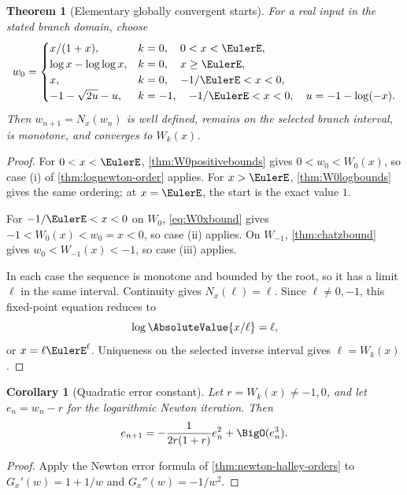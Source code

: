 \documentclass[11pt]{article}
\newtheorem{theorem}{Theorem}[section]
\newtheorem{corollary}[corollary]{Corollary}
\theoremstyle{remark}
\begin{document}
\begin{theorem}[Elementary globally convergent starts]\label{thm:globalstarts}
For a real input in the stated branch domain, choose
\begin{equation}\label{eq:globalstarts}
 w_0=
 \begin{cases}
  x/(1+x),&k=0,\quad 0<x<\EulerE,\\
  \log x-\log\log x,&k=0,\quad x\geq\EulerE,\\
  x,&k=0,\quad -1/\EulerE<x<0,\\
  -1-\sqrt{2u}-u,&k=-1,\quad
       -1/\EulerE<x<0,\quad u=-1-\log(-x).
 \end{cases}
\end{equation}
Then \(w_{n+1}=N_x(w_n)\) is well defined, remains on the selected branch
interval, is monotone, and converges to \(W_k(x)\).
\end{theorem}

\begin{proof}
For \(0<x<\EulerE\), \cref{thm:W0positivebounds} gives
\(0<w_0<W_0(x)\), so case (i) of
\cref{thm:lognewton-order} applies.  For \(x>\EulerE\),
\cref{thm:W0logbounds} gives the same ordering; at \(x=\EulerE\), the start is
the exact value \(1\).

For \(-1/\EulerE<x<0\) on \(W_0\), \eqref{eq:W0xbound} gives
\(-1<W_0(x)<w_0=x<0\), so case (ii) applies.  On \(W_{-1}\),
\cref{thm:chatzbound} gives
\(w_0<W_{-1}(x)<-1\), so case (iii) applies.

In each case the sequence is monotone and bounded by the root, so it has a
limit \(\ell\) in the same interval.  Continuity gives
\(N_x(\ell)=\ell\).  Since \(\ell\neq0,-1\), this fixed-point equation
reduces to
\[
       \log\AbsoluteValue{x/\ell}=\ell,
\]
or \(x=\ell\EulerE^\ell\).  Uniqueness on the selected inverse interval gives
\(\ell=W_k(x)\).
\end{proof}

\begin{corollary}[Quadratic error constant]\label{cor:lognewton-local}
Let \(r=W_k(x)\neq-1,0\), and let \(e_n=w_n-r\) for the logarithmic Newton
iteration.  Then
\begin{equation}\label{eq:lognewton-error}
 e_{n+1}
 =-\frac{1}{2r(1+r)}e_n^2+\BigO(e_n^3).
\end{equation}
\end{corollary}

\begin{proof}
Apply the Newton error formula of
\cref{thm:newton-halley-orders} to
\(G_x'(w)=1+1/w\) and \(G_x''(w)=-1/w^2\).
\end{proof}
\end{document}
